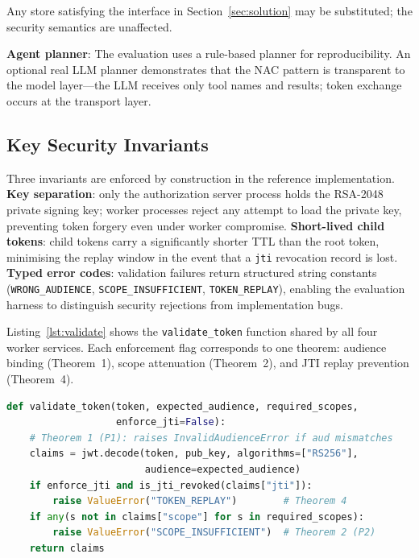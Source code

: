 \documentclass[journal]{IEEEtran}
\begin{document}
Any store satisfying the interface in Section~\ref{sec:solution} may be
substituted; the security semantics are unaffected.

\textbf{Agent planner}: The evaluation uses a rule-based planner for
reproducibility. An optional real LLM planner demonstrates that the NAC pattern
is transparent to the model layer---the LLM receives only tool names and results;
token exchange occurs at the transport layer.

\subsection{Key Security Invariants}

Three invariants are enforced by construction in the reference implementation.
\textbf{Key separation}: only the authorization server process holds the
RSA-2048 private signing key; worker processes reject any attempt to load the
private key, preventing token forgery even under worker compromise.
\textbf{Short-lived child tokens}: child tokens carry a significantly shorter
TTL than the root token, minimising the replay window in the event that a
\texttt{jti} revocation record is lost.
\textbf{Typed error codes}: validation failures return structured string
constants (\texttt{WRONG\_AUDIENCE}, \texttt{SCOPE\_INSUFFICIENT},
\texttt{TOKEN\_REPLAY}), enabling the evaluation harness to distinguish
security rejections from implementation bugs.

Listing~\ref{lst:validate} shows the \texttt{validate\_token} function shared
by all four worker services. Each enforcement flag corresponds to one theorem:
audience binding (Theorem~1), scope attenuation (Theorem~2), and JTI replay
prevention (Theorem~4).

\begin{lstlisting}[language=Python, label=lst:validate,
  caption={Worker token validation (\texttt{nac\_common.py}); each check
  corresponds to one theorem.}]
def validate_token(token, expected_audience, required_scopes,
                   enforce_jti=False):
    # Theorem 1 (P1): raises InvalidAudienceError if aud mismatches
    claims = jwt.decode(token, pub_key, algorithms=["RS256"],
                        audience=expected_audience)
    if enforce_jti and is_jti_revoked(claims["jti"]):
        raise ValueError("TOKEN_REPLAY")        # Theorem 4
    if any(s not in claims["scope"] for s in required_scopes):
        raise ValueError("SCOPE_INSUFFICIENT")  # Theorem 2 (P2)
    return claims
\end{lstlisting}
\end{document}
